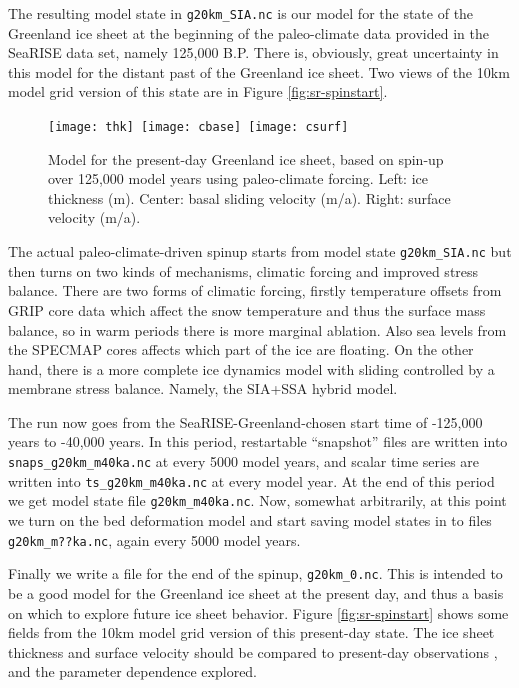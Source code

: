 The resulting model state in \texttt{g20km_SIA.nc} is our model for the state of the Greenland ice sheet at the beginning of the paleo-climate data provided in the SeaRISE data set, namely 125,000 B.P.  There is, obviously, great uncertainty in this model for the distant past of the Greenland ice sheet.  Two views of the 10km model grid version of this state are in Figure \ref{fig:sr-spinstart}.

\begin{figure}[ht]
\centering
\mbox{\texttt{[image: thk]}
  \qquad \texttt{[image: cbase]}
  \qquad \texttt{[image: csurf]}}
\caption{Model for the present-day Greenland ice sheet, based on spin-up over 125,000 model years using paleo-climate forcing.  Left: ice thickness (m).  Center: basal sliding velocity (m/a).  Right: surface velocity (m/a).}
\label{fig:sr-spindone-map}
\end{figure}


The actual paleo-climate-driven spinup starts from model state \texttt{g20km_SIA.nc} but then turns on two kinds of mechanisms, climatic forcing and improved stress balance.  There are two forms of climatic forcing, firstly temperature offsets from GRIP core data which affect the snow temperature and thus the surface mass balance, so in warm periods there is more marginal ablation.  Also sea levels from the SPECMAP cores affects which part of the ice are floating.  On the other hand, there is a more complete ice dynamics model with sliding controlled by a membrane stress balance.  Namely, the SIA+SSA hybrid model.

The run now goes from the SeaRISE-Greenland-chosen start time of -125,000 years to -40,000 years.  In this period, restartable ``snapshot'' files are written into \texttt{snaps_g20km_m40ka.nc} at every 5000 model years, and scalar time series are written into \texttt{ts_g20km_m40ka.nc} at every model year.  At the end of this period we get model state file \texttt{g20km_m40ka.nc}.  Now, somewhat arbitrarily, at this point we turn on the bed deformation model and start saving model states in to files \texttt{g20km_m??ka.nc}, again every 5000 model years.

Finally we write a file for the end of the spinup, \texttt{g20km_0.nc}.  This is intended to be a good model for the Greenland ice sheet at the present day, and thus a basis on which to explore future ice sheet behavior.  Figure \ref{fig:sr-spinstart} shows some fields from the 10km model grid version of this present-day state.  The ice sheet thickness and surface velocity should be compared to present-day observations \cite{BKAJS}, and the parameter dependence explored.

